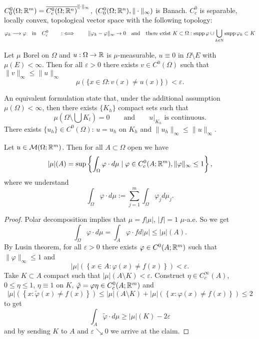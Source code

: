 \begin{remark}
$C^0_0(\Omega;\mathbb{R}^m) = \overline{C^0_c(\Omega;\mathbb{R}^n)}^{\|\cdot\|_\infty}$,
$(C^0_0(\Omega;\mathbb{R}^n),\|\cdot\|_\infty)$ is Banach.
$C^0_c$ is separable, locally convex, topological vector space with the
following topology:
\[
\varphi_k \longrightarrow \varphi \quad \text{in} \quad C^0_c 
\qquad :\iff \qquad
\|\varphi_k - \varphi\|_\infty \to 0
\quad \text{and} \quad
\text{there exist } K \subset \Omega:
\operatorname{supp} \varphi \cup \bigcup_{k\in\mathbb{N}} \operatorname{supp} \varphi_k \subset K
\]
\end{remark}

\begin{theorem}[Lusin]
Let $\mu$ Borel on $\Omega$ and $u : \Omega \to \mathbb{R}$ is $\mu$-measurable, $u
\equiv 0$ in $\Omega \setminus E$ with $\mu(E) < \infty$. Then for all
$\varepsilon > 0$ there exists $v \in C^0(\Omega)$ such that $\|v\|_\infty
\leq \|u\|_\infty$
\[
\mu(\{x \in \Omega: v(x) \neq u(x)\}) < \varepsilon.
\]
\end{theorem}

\begin{remark}
An equivalent formulation state that, under the additional assumption
$\mu(\Omega) < \infty$, then there exists $\{K_h\}$ compact sets such that
\[
\mu(\Omega \setminus \bigcup K_l) = 0
\qquad \text{and} \qquad
u\big|_{K_h} \text{ is continuous}.
\]
There exists $\{u_h\} \in C^0(\Omega)$: $u = u_h$ on $K_h$ and $\|u_h\|_\infty
\leq \|u\|_\infty$.
\end{remark}

\begin{proposition}
Let $u \in \mathcal{M}(\Omega;\mathbb{R}^m)$. Then for all $A\subset \Omega$ open we
have 
\[
|\mu|(A) = \sup\left\{ \int_\Omega \varphi \cdot d\mu \mid 
\varphi \in C^0_c(A;\mathbb{R}^m), \|\varphi\|_\infty \leq 1\right\},
\]
where we understand 
\[
\int_\Omega \varphi \cdot d\mu := \sum_{j=1}^m \int_\Omega \varphi_j d\mu_j.
\]
\end{proposition}

\begin{proof}
Polar decomposition implies that
$\mu = f|\mu|$, $|f| =1 $ $\mu$-a.e. So we get
\[
\int_\Omega \varphi \cdot d\mu = \int_A \varphi \cdot fd|\mu| \leq |\mu|(A).
\]
By Lusin theorem, for all $\varepsilon > 0$ there exists $\varphi \in
C^0(A;\mathbb{R}^m)$ such that $\|\varphi\|_\infty \leq 1$ and 
\[
|\mu|\left(\left\{x \in A : \varphi(x) \neq f(x)\right\}\right) < \varepsilon.
\]
Take $K \subset A$ compact such that $|\mu|(A\setminus K) < \varepsilon$.
Construct $\eta \in C^\infty_c(A)$, $0 \leq \eta \leq 1$, $\eta \equiv 1$ on
$K$, $\tilde \varphi = \varphi \eta \in C^0_c(A;\mathbb{R}^m)$ and 
\[
|\mu|\left(\left\{ x: \tilde \varphi(x) \neq f(x) \right\}\right)
\leq
|\mu|(A\setminus K)
+
|\mu|\left(\left\{ x: \varphi(x) \neq f(x) \right\}\right)
\leq 2
\]
to get 
\[
\int_A \tilde \varphi \cdot d\mu \geq |\mu|(K) - 2 \varepsilon 
\]
and by sending $K$ to $A$ and $\varepsilon \searrow 0$ we arrive at the claim.
\end{proof}
